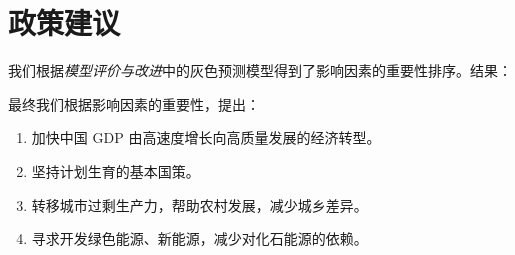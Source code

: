 \section{政策建议}
  \label{sec:zhencejianyi}

  我们根据\emph{模型评价与改进}中的灰色预测模型得到了影响因素的重要性排序。结果：

  最终我们根据影响因素的重要性，提出：
  \begin{enumerate}
    \item 加快中国 $\mathrm{GDP}$ 由高速度增长向高质量发展的经济转型。
    \item 坚持计划生育的基本国策。
    \item 转移城市过剩生产力，帮助农村发展，减少城乡差异。
    \item 寻求开发绿色能源、新能源，减少对化石能源的依赖。
  \end{enumerate}